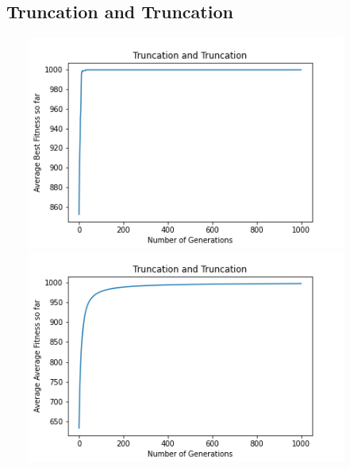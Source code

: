 \documentclass[a4paper]{article}
\begin{document}
\subsection{Truncation and Truncation}
\includegraphics[width=12cm, height=7cm]{Graphs/KnapSack/trunc_trunc_bsf.png} \\
\includegraphics[width=12cm, height=7cm]{Graphs/KnapSack/trunc_trunc_avg.png} \\
\end{document}

